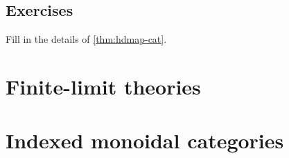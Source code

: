 \begin{wip}

\subsection*{Exercises}

\begin{ex}\label{ex:hdmap-cat}
  Fill in the details of \cref{thm:hdmap-cat}.
\end{ex}

\end{wip}


\section{Finite-limit theories}
\label{sec:lex-theories}




\section{Indexed monoidal categories}
\label{sec:indexed-moncat}

